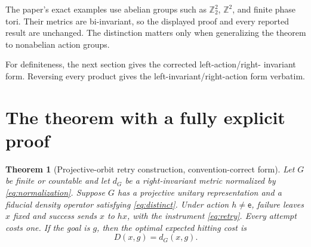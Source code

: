 \documentclass[11pt]{article}
\newtheorem{theorem}{Theorem}[section]
\theoremstyle{definition}
\theoremstyle{remark}
\newcommand{\Z}{\mathbb Z}
\newcommand{\id}{\mathsf e}
\begin{document}
The paper's exact examples use abelian groups such as \(\Z_2^2\), \(\Z^2\),
and finite phase tori.  Their metrics are bi-invariant, so the displayed proof
and every reported result are unchanged.  The distinction matters only when
generalizing the theorem to nonabelian action groups.

For definiteness, the next section gives the corrected left-action/right-
invariant form.  Reversing every product gives the left-invariant/right-action
form verbatim.

\section{The theorem with a fully explicit proof}

\begin{theorem}[Projective-orbit retry construction, convention-correct form]
\label{thm:retry}
Let \(G\) be finite or countable and let \(d_G\) be a right-invariant metric
normalized by \eqref{eq:normalization}. Suppose \(G\) has a projective
unitary representation and a fiducial density operator satisfying
\eqref{eq:distinct}. Under action \(h\ne\id\), failure leaves \(x\) fixed and
success sends \(x\) to \(hx\), with the instrument \eqref{eq:retry}. Every
attempt costs one. If the goal is \(g\), then the optimal expected hitting
cost is
\[
  D(x,g)=d_G(x,g).
\]
\end{theorem}
\end{document}
